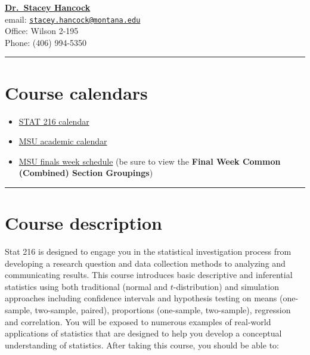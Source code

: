 \documentclass[
]{article}
\providecommand{\tightlist}{%
  \setlength{\itemsep}{0pt}\setlength{\parskip}{0pt}}
\begin{document}
\href{https://math.montana.edu/directory/faculty/1941032/stacey-hancock}{\textbf{Dr.~Stacey
Hancock}}\\
email:
\href{mailto:stacey.hancock@montana.edu}{\nolinkurl{stacey.hancock@montana.edu}}\\
Office: Wilson 2-195\\
Phone: (406) 994-5350

\begin{center}\rule{0.5\linewidth}{0.5pt}\end{center}

\section{Course calendars}\label{course-calendars}

\begin{itemize}
\tightlist
\item
  \href{calendars/S25-Stat216_Calendar.pdf}{STAT 216 calendar}
\item
  \href{http://catalog.montana.edu/academiccalendar/}{MSU academic
  calendar}
\item
  \href{https://www.montana.edu/registrar/Schedules.html}{MSU finals
  week schedule} (be sure to view the \textbf{Final Week Common
  (Combined) Section Groupings})
\end{itemize}

\begin{center}\rule{0.5\linewidth}{0.5pt}\end{center}

\section{Course description}\label{course-description}

Stat 216 is designed to engage you in the statistical investigation
process from developing a research question and data collection methods
to analyzing and communicating results. This course introduces basic
descriptive and inferential statistics using both traditional (normal
and \(t\)-distribution) and simulation approaches including confidence
intervals and hypothesis testing on means (one-sample, two-sample,
paired), proportions (one-sample, two-sample), regression and
correlation. You will be exposed to numerous examples of real-world
applications of statistics that are designed to help you develop a
conceptual understanding of statistics. After taking this course, you
should be able to:
\end{document}
